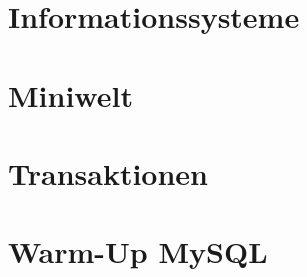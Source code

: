 \documentclass[ngerman]{gdb-aufgabenblatt}
\begin{document}
\section{Informationssysteme}
	\subsection{} %
	\subsection{} %
	\subsection{} %

\section{Miniwelt}
	\subsection{} %
	\subsection{} %

\section{Transaktionen}


\section{Warm-Up MySQL}
	\subsection{} %
	\subsection{} %
	\subsection{} %
	
\end{document}
